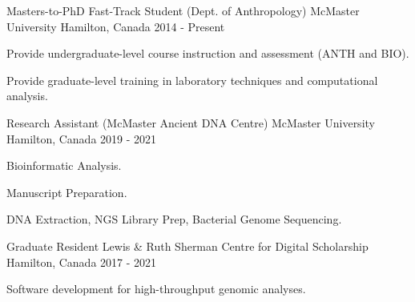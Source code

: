 


\begin{cventries} 


    \cventry
        {Masters-to-PhD Fast-Track Student (Dept. of Anthropology)} %
        {McMaster University} %
        {Hamilton, Canada} %
        {2014 - Present} %
        {
        \begin{cvitems} %
            \item {Provide undergraduate-level course instruction and assessment (ANTH and BIO).}
			\item {Provide graduate-level training in laboratory techniques and computational analysis.}
        \end{cvitems}
        }

    \cventry
        {Research Assistant (McMaster Ancient DNA Centre)} %
        {McMaster University} %
        {Hamilton, Canada} %
        {2019 - 2021} %
        {
        \begin{cvitems} %
            \item {Bioinformatic Analysis.}
			\item {Manuscript Preparation.}
			\item {DNA Extraction, NGS Library Prep, Bacterial Genome Sequencing.}
        \end{cvitems}
        }

    \cventry
        {Graduate Resident} %
        {Lewis \& Ruth Sherman Centre for Digital Scholarship} %
        {Hamilton, Canada} %
        {2017 - 2021} %
        {
        \begin{cvitems} %
            \item {Software development for high-throughput genomic analyses.}
        \end{cvitems}
        }


\end{cventries}

